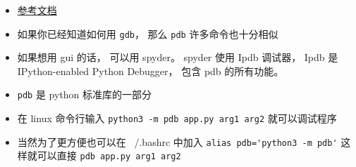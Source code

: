 
\begin{issues}
\issueDraft
\end{issues}

\begin{itemize}
\item \href{https://docs.python.org/3/library/pdb.html}{参考文档}
\item 如果你已经知道如何用 \verb|gdb|， 那么 \verb|pdb| 许多命令也十分相似
\item 如果想用 gui 的话， 可以用 spyder。 spyder 使用 Ipdb 调试器， Ipdb 是 IPython-enabled Python Debugger， 包含 pdb 的所有功能。
\item \verb|pdb| 是 python 标准库的一部分
\item 在 linux 命令行输入 \verb|python3 -m pdb app.py arg1 arg2| 就可以调试程序
\item 当然为了更方便也可以在 ~/.bashrc 中加入 \verb|alias pdb='python3 -m pdb'| 这样就可以直接 \verb|pdb app.py arg1 arg2|
\end{itemize}
